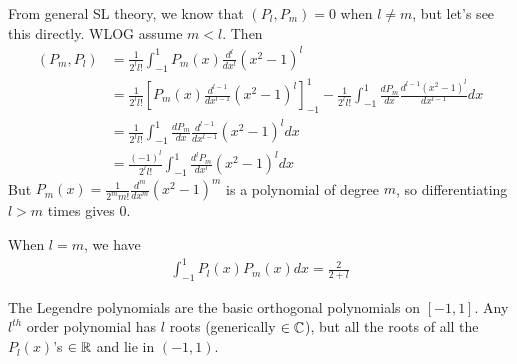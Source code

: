 \documentclass[a4paper]{article}
\begin{document}
\begin{eg}
From general SL theory, we know that $\left(P_l,P_m\right) = 0$ when $l\neq m$, but let's see this directly. WLOG assume $m<l$. Then
\begin{equation*}
\begin{aligned}
\left(P_m,P_l\right) &= \frac{1}{2^l l!} \int_{-1}^1 P_m\left(x\right) \frac{d^l}{dx^l} \left(x^2-1\right)^l\\
&= \frac{1}{2^l l!}\left[P_m\left(x\right) \frac{d^{l-1}}{dx^{l-1}} \left(x^2-1\right)^l\right]_{-1}^1 - \frac{1}{2^l l!} \int_{-1}^1 \frac{d P_m}{dx} \frac{d^{l-1}\left(x^2-1\right)^l}{dx^{l-1}} dx\\
&= \frac{1}{2^l l!} \int_{-1}^1 \frac{d P_m}{dx} \frac{d^{l-1}}{dx^{l-1}}\left(x^2-1\right)^l dx\\
&= \frac{\left(-1\right)^l}{2^l l!} \int_{-1}^1 \frac{d^l P_m}{dx^l} \left(x^2-1\right)^l dx
\end{aligned}
\end{equation*}
But $P_m\left(x\right) = \frac{1}{2^m m!} \frac{d^m}{dx^m} \left(x^2-1\right)^m$ is a polynomial of degree $m$, so differentiating $l>m$ times gives $0$.

When $l=m$, we have
\begin{equation*}
\begin{aligned}
\int_{-1}^1 P_l\left(x\right) P_m\left(x\right) dx = \frac{2}{2+l}
\end{aligned}
\end{equation*}

The Legendre polynomials are the basic orthogonal polynomials on $\left[-1,1\right]$. Any $l^{th}$ order polynomial has $l$ roots (generically $\in \mathbb{C}$), but all the roots of all the $P_l\left(x\right)$'s $\in \mathbb{R}$ and lie in $\left(-1,1\right)$.


\end{eg}
\end{document}
